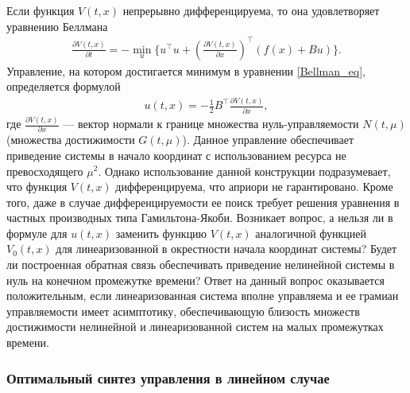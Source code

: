 \documentclass[../main.tex]{subfiles}
\begin{document}
Если функция $V(t,x)$ непрерывно дифференцируема, то она  удовлетворяет уравнению Беллмана
\begin{gather}\label{Bellman_eq}
	\frac{\partial V(t,x)}{\partial t} = -\min\limits_{u} \{u^{\top} u + \left(\frac{\partial V(t,x)}{\partial x}\right)^{\top} \left(f(x)+B u\right) \}.
\end{gather}
Управление, на котором достигается минимум в уравнении \eqref{Bellman_eq}, определяется формулой
\begin{gather}\label{feedback}
	u(t,x) = -\frac{1}{2} B^{\top}\frac{\partial V(t,x)}{\partial x},
\end{gather}
где $\frac{\partial V(t,x)}{\partial x}$ --- вектор нормали к границе множества нуль-управляемости $N(t,\mu)$ (множества достижимости $G(t,\mu)$). Данное управление обеспечивает приведение системы в начало координат с использованием ресурса не превосходящего $\mu^2$. Однако использование данной конструкции подразумевает, что функция $V(t,x)$ дифференцируема, что априори не гарантировано. Кроме того, даже в случае  дифференцируемости ее поиск требует решения уравнения в частных производных типа Гамильтона-Якоби. Возникает вопрос, а нельзя ли в формуле для $u(t,x)$ заменить функцию $V(t,x)$ аналогичной функцией $V_0(t,x)$ для линеаризованной в окрестности начала координат системы? Будет ли построенная обратная связь обеспечивать приведение нелинейной системы в нуль на конечном промежутке времени?  Ответ на данный вопрос оказывается положительным, если линеаризованная система вполне управляема и ее грамиан управляемости имеет асимптотику, обеспечивающую близость множеств достижимости нелинейной и линеаризованной систем на малых промежутках времени.
\subsubsection{Оптимальный синтез управления в линейном случае}

\end{document}

